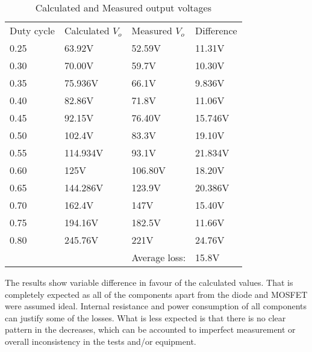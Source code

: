 \begin{table}[H]
\begin{center}
\caption {Calculated and Measured output voltages} \label{tab:V_OUT_ALL} 
\vspace{-1mm}
\begin{tabular}{|l|l|l|l|}
\cline{1-4}
Duty cycle & Calculated $V_o$ & Measured $V_o$& Difference \\ \cline{1-4}
0.25&	63.92V & 52.59V & 11.31V \\ \cline{1-4}
0.30&	70.00V & 59.7V & 10.30V \\ \cline{1-4}
0.35&	75.936V & 66.1V & 9.836V \\ \cline{1-4}
0.40&	82.86V & 71.8V & 11.06V \\ \cline{1-4}
0.45&	92.15V & 76.40V & 15.746V \\ \cline{1-4}
0.50&	102.4V & 83.3V & 19.10V \\ \cline{1-4}
0.55&	114.934V & 93.1V & 21.834V \\ \cline{1-4}
0.60&	125V & 106.80V & 18.20V\\ \cline{1-4}
0.65&	144.286V & 123.9V & 20.386V \\ \cline{1-4}
0.70&	162.4V & 147V & 15.40V\\ \cline{1-4}
0.75&	194.16V & 182.5V & 11.66V \\ \cline{1-4}
0.80&	245.76V & 221V & 24.76V\\ \cline{1-4}
&	 & Average loss:  & 15.8V \\ \cline{1-4}
\end{tabular}
\end{center}
\end{table}

The results show variable difference in favour of the calculated values. That is completely expected as all of the components apart from the diode and MOSFET were assumed ideal. Internal resistance and power consumption of all components can justify some of the losses. What is less expected is that there is no clear pattern in the decreases, which can be accounted to imperfect measurement or overall inconsistency in the tests and/or equipment. 

